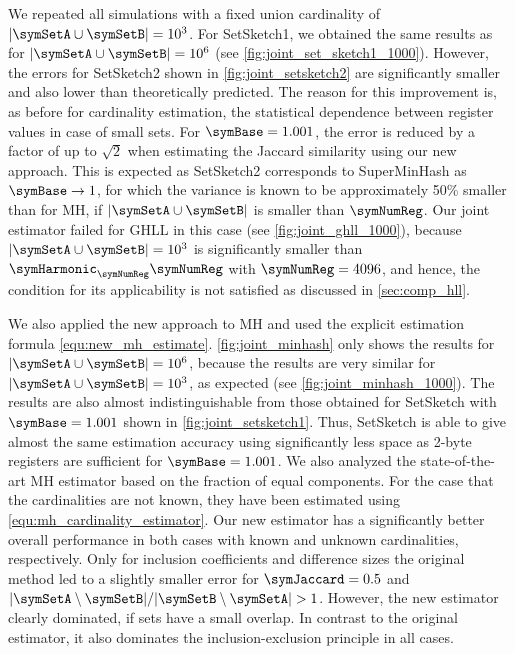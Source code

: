 \documentclass[sigconf, nonacm]{acmart}
\newif\ifextended\extendedtrue
\begin{document}
We repeated all simulations with a fixed union cardinality of $|\symSetA\cup\symSetB|=\num{e3}$.
For SetSketch1, we obtained the same results as for $|\symSetA\cup\symSetB|=\num{e6}$ \ifextended(see \cref{fig:joint_set_sketch1_1000})\else\cite{Ertl2021}\fi. 
However, the errors for SetSketch2 shown in \cref{fig:joint_setsketch2} are significantly smaller and also lower than theoretically predicted. The reason for this improvement is, as before for cardinality estimation, the statistical dependence between register values in case of small sets. For $\symBase=1.001$, the error is reduced by a factor of up to $\sqrt{2}$ when estimating the Jaccard similarity using our new approach. This is expected as SetSketch2 corresponds to SuperMinHash \cite{Ertl2017b} as $\symBase\rightarrow 1$, for which the variance is known to be approximately 50\% smaller than for \ac{MH}, if $|\symSetA\cup\symSetB|$ is smaller than $\symNumReg$. 
Our joint estimator failed for \ac{GHLL} in this case \ifextended(see \cref{fig:joint_ghll_1000})\else\cite{Ertl2021}\fi, because $|\symSetA\cup\symSetB|=\num{e3}$ is significantly smaller than $\symHarmonic_\symNumReg \symNumReg$ with $\symNumReg=4096$, and hence, the condition for its applicability is not satisfied as discussed in \cref{sec:comp_hll}.

We also applied the new approach to \ac{MH} and used the explicit estimation formula \eqref{equ:new_mh_estimate}. \cref{fig:joint_minhash} only shows the results for $|\symSetA\cup\symSetB|=10^6$, because the results are very similar for $|\symSetA\cup\symSetB|=10^3$, as expected \ifextended(see \cref{fig:joint_minhash_1000})\else\cite{Ertl2021}\fi. The results are also almost indistinguishable from those obtained for SetSketch with $\symBase=1.001$ shown in \cref{fig:joint_setsketch1}. 
Thus, SetSketch is able to give almost the same estimation accuracy using significantly less space as 2-byte registers are sufficient for $\symBase=1.001$. 
We also analyzed the state-of-the-art \ac{MH} estimator based on the fraction of equal components. For the case that the cardinalities are not known, they have been estimated using \eqref{equ:mh_cardinality_estimator}. Our new estimator has a significantly better overall performance in both cases with known and unknown cardinalities, respectively. Only for inclusion coefficients and difference sizes the original method led to a slightly smaller error for $\symJaccard=0.5$ and $|\symSetA\setminus\symSetB|/|\symSetB\setminus\symSetA| > 1$. However, the new estimator clearly dominated, if sets have a small overlap. In contrast to the original estimator, it also dominates the inclusion-exclusion principle in all cases.
\end{document}
